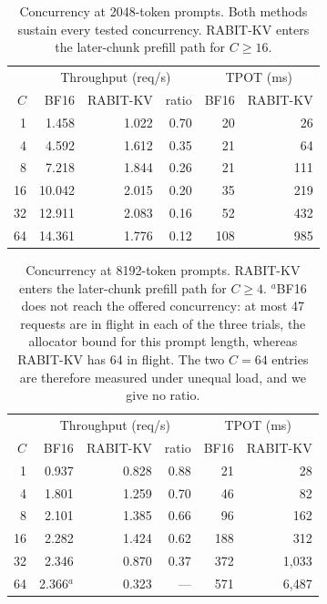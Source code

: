 \documentclass{article}
\begin{document}
\begin{table}[h]
\centering
\small
\setlength{\tabcolsep}{3.5pt}
\begin{tabular}{@{}rrrrrr@{}}
\toprule
 & \multicolumn{3}{c}{Throughput (req/s)} & \multicolumn{2}{c}{TPOT (ms)} \\
$C$ & BF16 & RABIT-KV & ratio & BF16 & RABIT-KV \\
\midrule
1 & 1.458 & 1.022 & 0.70 & 20 & 26 \\
4 & 4.592 & 1.612 & 0.35 & 21 & 64 \\
8 & 7.218 & 1.844 & 0.26 & 21 & 111 \\
16 & 10.042 & 2.015 & 0.20 & 35 & 219 \\
32 & 12.911 & 2.083 & 0.16 & 52 & 432 \\
64 & 14.361 & 1.776 & 0.12 & 108 & 985 \\
\bottomrule
\end{tabular}
\caption{Concurrency at 2048-token prompts. Both methods sustain every tested concurrency. RABIT-KV
enters the later-chunk prefill path for $C \ge 16$.}
\label{tab:app-c2048}
\end{table}

\begin{table}[h]
\centering
\small
\setlength{\tabcolsep}{3.5pt}
\begin{tabular}{@{}rrrrrr@{}}
\toprule
 & \multicolumn{3}{c}{Throughput (req/s)} & \multicolumn{2}{c}{TPOT (ms)} \\
$C$ & BF16 & RABIT-KV & ratio & BF16 & RABIT-KV \\
\midrule
1 & 0.937 & 0.828 & 0.88 & 21 & 28 \\
4 & 1.801 & 1.259 & 0.70 & 46 & 82 \\
8 & 2.101 & 1.385 & 0.66 & 96 & 162 \\
16 & 2.282 & 1.424 & 0.62 & 188 & 312 \\
32 & 2.346 & 0.870 & 0.37 & 372 & 1,033 \\
64 & 2.366$^{a}$ & 0.323 & --- & 571 & 6,487 \\
\bottomrule
\end{tabular}
\caption{Concurrency at 8192-token prompts. RABIT-KV enters the later-chunk prefill path for $C \ge 4$.
$^{a}$BF16 does not reach the offered concurrency: at most 47 requests are in flight in each of the
three trials, the allocator bound for this prompt length, whereas RABIT-KV has 64 in flight. The two
$C{=}64$ entries are therefore measured under unequal load, and we give no ratio.}
\label{tab:app-c8192}
\end{table}
\end{document}
